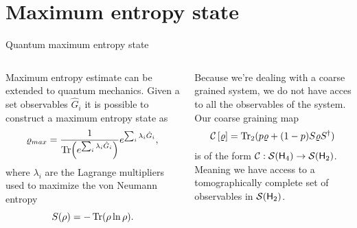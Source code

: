 \section{Maximum entropy state}

\begin{frame}{Quantum maximum entropy state}
    \begin{columns}
        \begin{column}{0.5\textwidth}
            Maximum entropy estimate can be extended to quantum mechanics. Given a set observables $\hat{G}_{i}$ it is possible to construct a maximum entropy state as
            \begin{equation*}
                \varrho_{max}=\frac{1}{\Tr(e^{\sum_{i}\lambda_{i}\hat{G}_{i}})}e^{\sum_{i}\lambda_{i}\hat{G}_{i}},
            \end{equation*}
            where $\lambda_{i}$ are the Lagrange multipliers used to maximize the von Neumann entropy
            \begin{equation*}
                S(\rho)=-\Tr(\rho\ln{\rho}).
            \end{equation*}
        \end{column}
        \begin{column}{0.5\textwidth}
            Because we're dealing with a coarse grained system, we do not have acces to all the observables of the system. Our coarse graining map
            \begin{equation*}
                \mathcal{C}\left[\varrho\right]=\Tr_{2}(p\varrho+(1-p)S\varrho S^{\dag})
            \end{equation*}
            is of the form $\mathcal{C}:\mathcal{S}({\sf H}_{4})\rightarrow\mathcal{S}({\sf H}_{2})$. Meaning we have access to a tomographically complete set of observables in $\mathcal{S}({\sf H}_{2})$. 
        \end{column}
    \end{columns}
\end{frame}

